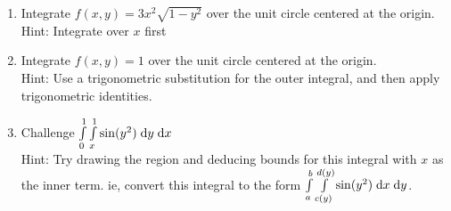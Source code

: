 \documentclass[letterpaper,11pt]{article}
\begin{document}
\begin{enumerate}
    \item Integrate $f(x, y) = 3 x^2 \sqrt{1 - y^2}$ over the unit circle centered at the origin.\\
      Hint: Integrate over $x$ first\\
      \newline
      \newline
      \newline
      \newline
      \newline

    \item Integrate $f(x, y) = 1$ over the unit circle centered at the origin.\\
      Hint: Use a trigonometric substitution for the outer integral, and then apply trigonometric identities.\\
      \newline
      \newline
      \newline
      \newline
      \newline

    \item Challenge $\int \limits_{0}^{1} \int \limits_{x}^{1} \sin(y^2) \;\mathrm{d}y \;\mathrm{d}x$\\
      Hint: Try drawing the region and deducing bounds for this integral with $x$ as the inner term.
      ie, convert this integral to the form $\int \limits_{a}^{b} \int \limits_{c(y)}^{d(y)} \sin(y^2) \;\mathrm{d}x \;\mathrm{d}y$.
  \end{enumerate}
\end{document}
